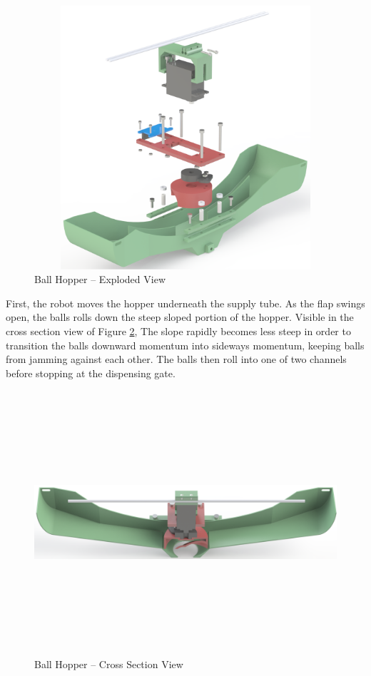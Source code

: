\begin{figure}[H]   %
	\centering \includegraphics[width=6in, height=3.85in, keepaspectratio]{figures/ball_hopper_explode.png}
	\caption{Ball Hopper -- Exploded View}	\label{fig:ball_hopper_explode}
\end{figure}

First, the robot moves the hopper underneath the supply tube. As the flap swings open, the balls rolls down the steep sloped portion of the hopper. Visible in the cross section view of Figure \ref{fig:ball_hopper_xsec}, The slope rapidly becomes less steep in order to transition the balls downward momentum into sideways momentum, keeping balls from jamming against each other. The balls then roll into one of two channels before stopping at the dispensing gate.

\begin{figure}[H]   %
	\centering \includegraphics[width=6in, height=3.85in, keepaspectratio]{figures/ball_hopper_xsec.png}
	\caption{Ball Hopper -- Cross Section View}	\label{fig:ball_hopper_xsec}
\end{figure}

